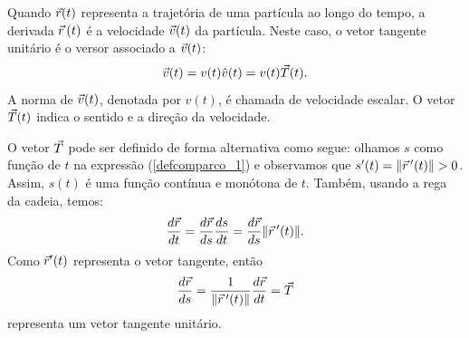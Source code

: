\begin{obs} Quando $\vec{r}(t)$ representa a trajetória de uma partícula ao longo do tempo, a derivada $\vec{r}\!~(t)$ é a velocidade $\vec{v}(t)$ da partícula. Neste caso, o vetor tangente unitário é o versor associado a $\vec{v}(t)$:
$$\vec{v}(t)=v(t) \hat{v}(t)=v(t) \vec{T}(t).$$
A norma de $\vec{v}(t)$, denotada por $v(t)$, é chamada de velocidade escalar. O vetor $\vec{T}(t)$ indica o sentido e a direção da velocidade.
\end{obs}

O vetor $\vec{T}$ pode ser definido de forma alternativa como segue: olhamos $s$ como função de $t$ na expressão (\ref{defcomparco_1}) e observamos que $s'(t)=\|\vct{r}\!~'(t)\|>0$. Assim, $s(t)$ é uma função contínua e monótona de $t$. Também, usando a rega da cadeia, temos:
$$
\frac{d\vec{r}}{dt}=\frac{d\vec{r}}{ds}\frac{ds}{dt}=\frac{d\vec{r}}{ds}\|\vec{r}\!~'(t)\|.
$$
Como $\vec{r}'(t)$ representa o vetor tangente, então
$$
\frac{d\vec{r}}{ds}=\frac{1}{\|\vec{r}\!~'(t)\|}\frac{d\vec{r}}{dt}=\vec{T}
$$
representa um vetor tangente unitário.

